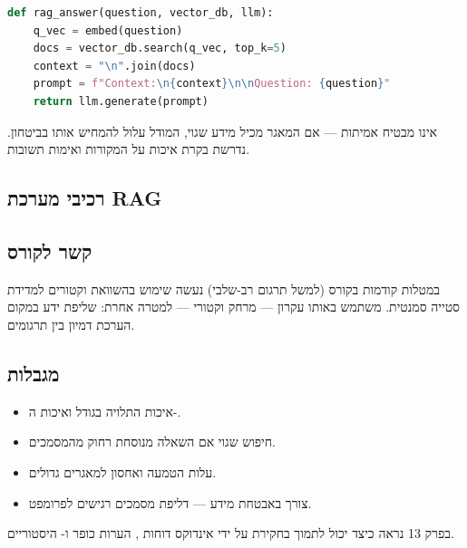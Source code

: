 \begin{lstlisting}[language=Python,caption={Pipeline בסיסי של RAG}]
def rag_answer(question, vector_db, llm):
    q_vec = embed(question)
    docs = vector_db.search(q_vec, top_k=5)
    context = "\n".join(docs)
    prompt = f"Context:\n{context}\n\nQuestion: {question}"
    return llm.generate(prompt)
\end{lstlisting}

\begin{warningbox}
 אינו מבטיח אמיתות --- אם המאגר מכיל מידע שגוי, המודל עלול
להמחיש אותו בביטחון. נדרשת בקרת איכות על המקורות ואימות תשובות.
\end{warningbox}

\subsection{רכיבי מערכת RAG}


\subsection{קשר לקורס}

במטלות קודמות בקורס (למשל תרגום רב-שלבי) נעשה שימוש בהשוואת וקטורים
למדידת סטייה סמנטית.  משתמש באותו עקרון --- מרחק וקטורי ---
למטרה אחרת: שליפת ידע במקום הערכת דמיון בין תרגומים.

\subsection{מגבלות}

\begin{itemize}[rightmargin=2em]
  \item איכות התלויה בגודל ואיכות ה-.
  \item חיפוש שגוי אם השאלה מנוסחת רחוק מהמסמכים.
  \item עלות הטמעה ואחסון למאגרים גדולים.
  \item צורך באבטחת מידע --- דליפת מסמכים רגישים לפרומפט.
\end{itemize}

\begin{insightbox}
בפרק 13 נראה כיצד  יכול לתמוך בחקירת  על ידי
אינדוקס דוחות , הערות כופר ו- היסטוריים.
\end{insightbox}
